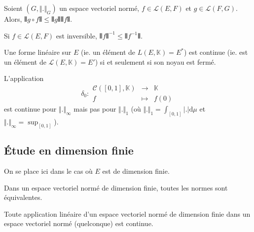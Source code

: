  \begin{proposition}
    Soient $(G, \Vert . \Vert_G)$ un espace vectoriel normé, $f \in \mathcal{L}(E,F)$ et $g \in \mathcal{L}(F,G)$. Alors, $\VERT g \circ f \VERT \leq \VERT g \VERT \VERT f \VERT$.
  \end{proposition}

  \begin{proposition}
    Si $f \in \mathcal{L}(E,F)$ est inversible, $\VERT f \VERT^{-1} \leq \VERT f^{-1} \VERT$.
  \end{proposition}

  \begin{proposition}
    Une forme linéaire sur $E$ (ie. un élément de $L(E, \mathbb{K}) = E^*$) est continue (ie. est un élément de $\mathcal{L}(E, \mathbb{K}) = E'$) si et seulement si son noyau est fermé.
  \end{proposition}


  \begin{example}
    L'application
    \[
    \delta_0 : \begin{array}{ccc}
      \mathcal{C}([0,1], \mathbb{K}) &\rightarrow& \mathbb{K} \\
      f &\mapsto& f(0)
    \end{array}
    \]
    est continue pour $\Vert . \Vert_\infty$ mais pas pour $\Vert . \Vert_1$ (où $\Vert . \Vert_1 = \int_{[0,1]} \vert . \vert \mathrm{d}\mu$ et $\Vert . \Vert_\infty = \sup_{[0,1]}$).
  \end{example}

  \subsection{Étude en dimension finie}

  On se place ici dans le cas où $E$ est de dimension finie.


  \begin{theorem}
    Dans un espace vectoriel normé de dimension finie, toutes les normes sont équivalentes.
  \end{theorem}

  \begin{corollary}
    Toute application linéaire d'un espace vectoriel normé de dimension finie dans un espace vectoriel normé (quelconque) est continue.
  \end{corollary}

